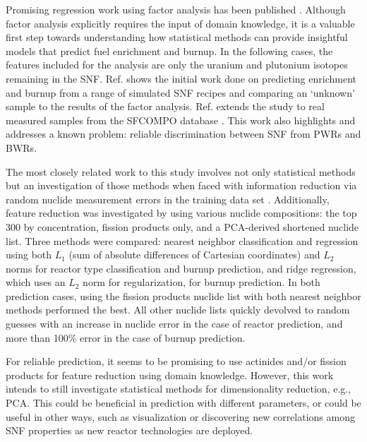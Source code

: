 Promising regression work using factor analysis has been published
\cite{nicolaou_2006, nicolaou_2014}.  Although factor analysis explicitly
requires the input of domain knowledge, it is a valuable first step towards
understanding how statistical methods can provide insightful models that
predict fuel enrichment and burnup. In the following cases, the features
included for the analysis are only the uranium and plutonium isotopes remaining
in the \gls{SNF}.  Ref. \cite{nicolaou_2006} shows the initial work done on
predicting enrichment and burnup from a range of simulated \gls{SNF} recipes
and comparing an `unknown' sample to the results of the factor analysis. Ref.
\cite{nicolaou_2014} extends the study to real measured samples from the
\gls{SFCOMPO} database \cite{sfcompo}. This work also highlights and addresses
a known problem: reliable discrimination between \gls{SNF} from \gls{PWR}s and
\gls{BWR}s. 


The most closely related work to this study involves not only statistical
methods but an investigation of those methods when faced with information
reduction via random nuclide measurement errors in the training data set
\cite{dayman_feasibility_2013}.  Additionally, feature reduction was
investigated by using various nuclide compositions: the top 300 by
concentration, fission products only, and a \gls{PCA}-derived shortened nuclide
list.  Three methods were compared: nearest neighbor classification and
regression using both $L_1$ (sum of absolute differences of Cartesian
coordinates) and $L_2$ norms for reactor type classification and burnup
prediction, and ridge regression, which uses an $L_2$ norm for regularization,
for burnup prediction. In both prediction cases, using the fission products
nuclide list with both nearest neighbor methods performed the best. All other
nuclide lists quickly devolved to random guesses with an increase in nuclide
error in the case of reactor prediction, and more than 100\% error in the case
of burnup prediction.

For reliable prediction, it seems to be promising to use actinides
\cite{nicolaou_2006, nicolaou_2014} and/or fission products
\cite{dayman_feasibility_2013} for feature reduction using domain knowledge.
However, this work intends to still investigate statistical methods for
dimensionality reduction, e.g., \gls{PCA}. This could be beneficial in
prediction with different parameters, or could be useful in other ways, such as
visualization or discovering new correlations among \gls{SNF} properties as new
reactor technologies are deployed.


